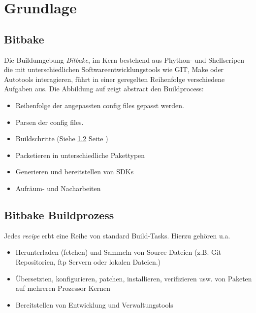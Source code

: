 

\chapter{Grundlage}%
\label{cha:grundlagen}

\section{Bitbake }%
\label{sec:bitbake_buildprozess}



Die Buildumgebung \textit{Bitbake}, im Kern bestehend aus Phython- und
Shellscripen die mit unterschiedlichen Softwareentwicklungstools wie GIT, Make
oder Autotools interagieren, führt in einer geregelten Reihenfolge verschiedene
Aufgaben aus. Die Abbildung auf \cite[S. 20]{Gonzalez2018:Embedded_Linux_Development_Using_Yocto_Project_Cookbook_2nd}
zeigt abstract den Build\-process:

\begin{itemize}
    \item Reihenfolge der angepassten config files gepasst werden.
    \item Parsen der config files.
    \item Buildschritte (Siehe \ref{sec:bitbake_build_tasks} Seite
        \pageref{sec:bitbake_build_tasks})
    \item Packetieren in unterschiedliche Pakettypen
    \item Generieren und bereitstellen von \aclp{SDK}
    \item Aufräum- und Nacharbeiten
\end{itemize}

\section{Bitbake Buildprozess}%
\label{sec:bitbake_build_tasks}

Jedes \textit{recipe} erbt eine Reihe von standard Build-Tasks.  Hierzu
gehören u.a.
\begin{itemize}
    \item Herunterladen (fetchen) und Sammeln von Source Dateien
        (z.B. Git Repositorien, ftp Servern oder lokalen Dateien.)
    \item Übersetzten, konfigurieren, patchen, installieren, verifizieren usw.
        von Paketen auf mehreren Prozessor Kernen
    \item Bereitstellen von Entwicklung und Verwaltungstools
\end{itemize}

